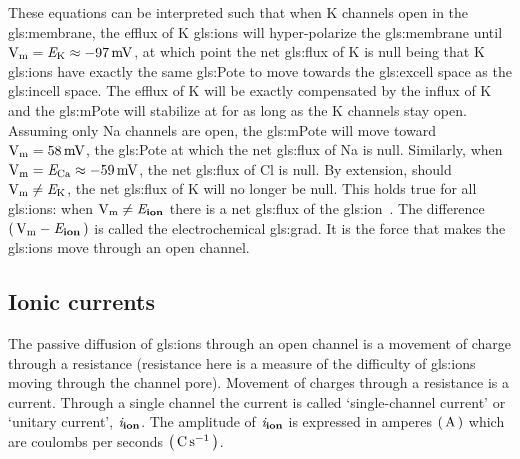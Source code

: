 \documentclass[class={myRUCProject}, crop=false]{standalone}
\begin{document}
These equations can be interpreted such that when
\gls{K} channels open in the \gls{gls:membrane}, the efflux of \gls{K} \glspl{gls:ion} will hyper-polarize the \gls{gls:membrane} until \(\unit{\V\membrane} = \equilibria\potassium \approx \qty{-97}{\mV}\), at which point the net \gls{gls:flux} of \gls{K} is null being that \gls{K} \glspl{gls:ion} have exactly the same \gls{gls:Pote} to move towards the \gls{gls:excell} space as the \gls{gls:incell} space. 
The efflux of \gls{K} will be exactly compensated by the influx of \gls{K} and the \gls{gls:mPote} will stabilize at \equilibria\potassium for as long as the \gls{K} channels stay open. 
Assuming only \gls{Na} channels are open, the \gls{gls:mPote} will move toward \(\unit{\V\membrane} = \qty{58}{\mV}\), the \gls{gls:Pote} at which the net \gls{gls:flux} of \gls{Na} is null. 
Similarly, when \(\unit{\V\membrane} = \equilibria\chlorine \approx \qty{-59}{\mV}\),  
the net \gls{gls:flux} of \gls{Cl} is null. 
By extension, should \(\unit{\V\membrane} \neq \equilibria\potassium\), the net \gls{gls:flux} of  \gls{K} will no longer be null. 
This holds true for all \glspl{gls:ion}: when \(\unit{\V\membrane} \neq \equilibria\ion\) there is a net \gls{gls:flux} of the \gls{gls:ion}~\cite{}. The difference \(\br{\unit{\V\membrane} - \equilibria\ion}\) is called the electrochemical \gls{gls:grad}. It is the force that makes the \glspl{gls:ion} move through an open channel.

\endgroup

\subsection{Ionic currents}
The passive diffusion of \glspl{gls:ion} through an open channel is a movement of charge through a resistance (resistance here is a measure of the difficulty of \glspl{gls:ion} moving through the channel pore). Movement of charges through a resistance is a current. Through a single channel the current is called `single-channel current' or `unitary current', \(\mathit{i}_\mathbf{ion}\). The amplitude of  \(\mathit{i}_\mathbf{ion}\) is expressed in amperes \(\br{\unit{\ampere}}\) which are coulombs per seconds \(\br{\unit{\coulomb\per\second}}\). 
\end{document}
